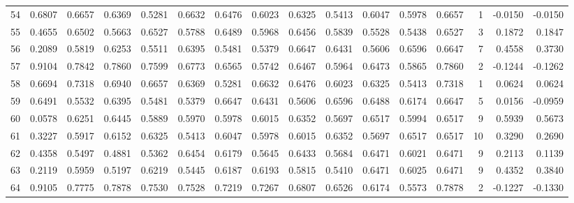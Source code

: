 \begin{tabular}{lrrrrrrrrrrrrrrr}
54  &      0.6807 &  0.6657 &  0.6369 &  0.5281 &  0.6632 &  0.6476 &  0.6023 &  0.6325 &  0.5413 &  0.6047 &   0.5978 &     0.6657 &      1 &                   -0.0150 &                    -0.0150 \\
55  &      0.4655 &  0.6502 &  0.5663 &  0.6527 &  0.5788 &  0.6489 &  0.5968 &  0.6456 &  0.5839 &  0.5528 &   0.5438 &     0.6527 &      3 &                    0.1872 &                     0.1847 \\
56  &      0.2089 &  0.5819 &  0.6253 &  0.5511 &  0.6395 &  0.5481 &  0.5379 &  0.6647 &  0.6431 &  0.5606 &   0.6596 &     0.6647 &      7 &                    0.4558 &                     0.3730 \\
57  &      0.9104 &  0.7842 &  0.7860 &  0.7599 &  0.6773 &  0.6565 &  0.5742 &  0.6467 &  0.5964 &  0.6473 &   0.5865 &     0.7860 &      2 &                   -0.1244 &                    -0.1262 \\
58  &      0.6694 &  0.7318 &  0.6940 &  0.6657 &  0.6369 &  0.5281 &  0.6632 &  0.6476 &  0.6023 &  0.6325 &   0.5413 &     0.7318 &      1 &                    0.0624 &                     0.0624 \\
59  &      0.6491 &  0.5532 &  0.6395 &  0.5481 &  0.5379 &  0.6647 &  0.6431 &  0.5606 &  0.6596 &  0.6488 &   0.6174 &     0.6647 &      5 &                    0.0156 &                    -0.0959 \\
60  &      0.0578 &  0.6251 &  0.6445 &  0.5889 &  0.5970 &  0.5978 &  0.6015 &  0.6352 &  0.5697 &  0.6517 &   0.5994 &     0.6517 &      9 &                    0.5939 &                     0.5673 \\
61  &      0.3227 &  0.5917 &  0.6152 &  0.6325 &  0.5413 &  0.6047 &  0.5978 &  0.6015 &  0.6352 &  0.5697 &   0.6517 &     0.6517 &     10 &                    0.3290 &                     0.2690 \\
62  &      0.4358 &  0.5497 &  0.4881 &  0.5362 &  0.6454 &  0.6179 &  0.5645 &  0.6433 &  0.5684 &  0.6471 &   0.6021 &     0.6471 &      9 &                    0.2113 &                     0.1139 \\
63  &      0.2119 &  0.5959 &  0.5197 &  0.6219 &  0.5445 &  0.6187 &  0.6193 &  0.5815 &  0.5410 &  0.6471 &   0.6025 &     0.6471 &      9 &                    0.4352 &                     0.3840 \\
64  &      0.9105 &  0.7775 &  0.7878 &  0.7530 &  0.7528 &  0.7219 &  0.7267 &  0.6807 &  0.6526 &  0.6174 &   0.5573 &     0.7878 &      2 &                   -0.1227 &                    -0.1330 \\

\end{tabular}
